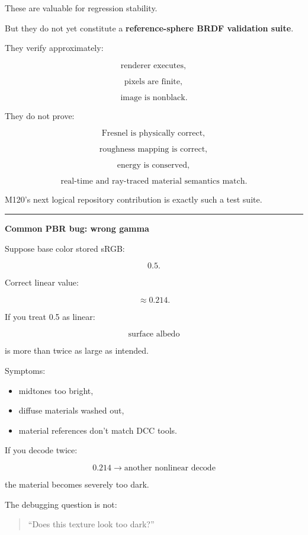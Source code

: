 These are valuable for regression stability.

But they do not yet constitute a \textbf{reference-sphere BRDF validation suite}.

They verify approximately:

\[
\text{renderer executes},
\]

\[
\text{pixels are finite},
\]

\[
\text{image is nonblack}.
\]

They do not prove:

\[
\text{Fresnel is physically correct},
\]

\[
\text{roughness mapping is correct},
\]

\[
\text{energy is conserved},
\]

\[
\text{real-time and ray-traced material semantics match}.
\]

M120's next logical repository contribution is exactly such a test suite.

\begin{center}\rule{0.5\linewidth}{0.5pt}\end{center}

\textbf{Common PBR bug: wrong gamma}

Suppose base color stored sRGB:

\[
0.5.
\]

Correct linear value:

\[
\approx0.214.
\]

If you treat 0.5 as linear:

\[
\text{surface albedo}
\]

is more than twice as large as intended.

Symptoms:

\begin{itemize}
\tightlist
\item
  midtones too bright,
\item
  diffuse materials washed out,
\item
  material references don't match DCC tools.
\end{itemize}

If you decode twice:

\[
0.214
\rightarrow
\text{another nonlinear decode}
\]

the material becomes severely too dark.

The debugging question is not:

\begin{quote}
``Does this texture look too dark?''
\end{quote}

